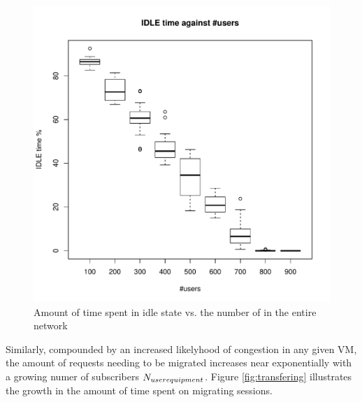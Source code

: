\begin{figure}[tb]
	\centering
	\includegraphics[width=\linewidth]{IDLE.pdf} 
	\caption{Amount of time spent in idle state vs. the number of \ues in the entire network}
	\label{fig:idle}
\end{figure}

Similarly, compounded by an increased likelyhood of congestion in any given VM, the amount of requests needing to be migrated increases near exponentially with a growing numer of subscribers $N_{user equipment}$. Figure \ref{fig:transfering} illustrates the growth in the amount of time spent on migrating sessions.

